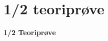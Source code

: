 \section{1/2 teoriprøve}

\begin{frame}
  \vspace{3em}
  \begin{center}
    {\LARGE \textbf{1/2 Teoriprøve}}
  \end{center}
\end{frame}